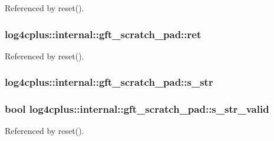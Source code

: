 Referenced by reset().

\hypertarget{structlog4cplus_1_1internal_1_1gft__scratch__pad_a29d49f6c449a5f9aa7091c568469c46e}{
\subsubsection[{ret}]{ log4cplus\-::internal\-::gft\-\_\-scratch\-\_\-pad\-::ret}}\label{structlog4cplus_1_1internal_1_1gft__scratch__pad_a29d49f6c449a5f9aa7091c568469c46e}


Referenced by reset().

\hypertarget{structlog4cplus_1_1internal_1_1gft__scratch__pad_a23de1cc13f0c058863c8a91c67f023a1}{
\subsubsection[{s\-\_\-str}]{ log4cplus\-::internal\-::gft\-\_\-scratch\-\_\-pad\-::s\-\_\-str}}\label{structlog4cplus_1_1internal_1_1gft__scratch__pad_a23de1cc13f0c058863c8a91c67f023a1}
\hypertarget{structlog4cplus_1_1internal_1_1gft__scratch__pad_aa18ae9863cf5d5a4b37c9b9ebaa7e4af}{
\subsubsection[{s\-\_\-str\-\_\-valid}]{\setlength{\rightskip}{0pt plus 5cm}bool log4cplus\-::internal\-::gft\-\_\-scratch\-\_\-pad\-::s\-\_\-str\-\_\-valid}}\label{structlog4cplus_1_1internal_1_1gft__scratch__pad_aa18ae9863cf5d5a4b37c9b9ebaa7e4af}


Referenced by reset().

